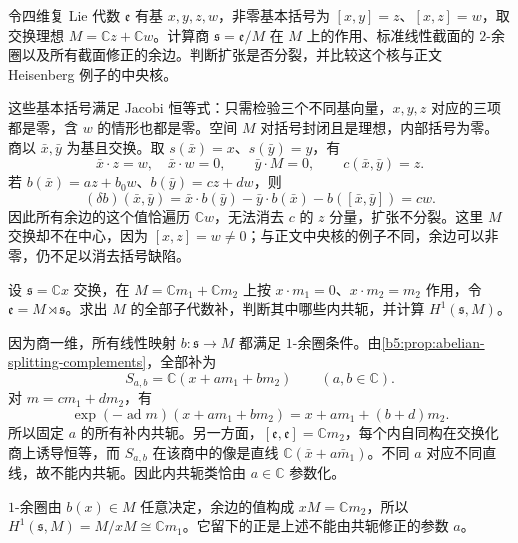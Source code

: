 \begin{optionalexercise}\label{b5:ex:12-abelian-extension-heisenberg}
	令四维复 Lie 代数 \(\mathfrak e\) 有基 \(x,y,z,w\)，非零基本括号为 \([x,y]=z\)、\([x,z]=w\)，取交换理想 \(M=\mathbb Cz+\mathbb Cw\)。计算商 \(\mathfrak s=\mathfrak e/M\) 在 \(M\) 上的作用、标准线性截面的 \(2\)-余圈以及所有截面修正的余边。判断扩张是否分裂，并比较这个核与正文 Heisenberg 例子的中央核。
\end{optionalexercise}
\begin{solution}
	这些基本括号满足 Jacobi 恒等式：只需检验三个不同基向量，\(x,y,z\) 对应的三项都是零，含 \(w\) 的情形也都是零。空间 \(M\) 对括号封闭且是理想，内部括号为零。商以 \(\bar x,\bar y\) 为基且交换。取 \(s(\bar x)=x\)、\(s(\bar y)=y\)，有
	\[
		\bar x\cdot z=w,\quad \bar x\cdot w=0, \qquad \bar y\cdot M=0, \qquad c(\bar x,\bar y)=z.
	\]
	若 \(b(\bar x)=az+b_0w\)、\(b(\bar y)=cz+dw\)，则
	\[
		(\delta b)(\bar x,\bar y) =\bar x\cdot b(\bar y)-\bar y\cdot b(\bar x)-b([\bar x,\bar y])=cw.
	\]
	因此所有余边的这个值恰遍历 \(\mathbb Cw\)，无法消去 \(c\) 的 \(z\) 分量，扩张不分裂。这里 \(M\) 交换却不在中心，因为 \([x,z]=w\ne0\)；与正文中央核的例子不同，余边可以非零，仍不足以消去括号缺陷。
\end{solution}

\begin{optionalexercise}\label{b5:ex:12-complement-graphs}
	设 \(\mathfrak s=\mathbb Cx\) 交换，在 \(M=\mathbb Cm_1+\mathbb Cm_2\) 上按 \(x\cdot m_1=0\)、\(x\cdot m_2=m_2\) 作用，令 \(\mathfrak e=M\rtimes\mathfrak s\)。求出 \(M\) 的全部子代数补，判断其中哪些内共轭，并计算 \(H^1(\mathfrak s,M)\)。
\end{optionalexercise}
\begin{solution}
	因为商一维，所有线性映射 \(b:\mathfrak s\rightarrow M\) 都满足 \(1\)-余圈条件。由\cref{b5:prop:abelian-splitting-complements}，全部补为
	\[
		S_{a,b}=\mathbb C(x+am_1+bm_2)\qquad(a,b\in\mathbb C).
	\]
	对 \(m=cm_1+dm_2\)，有
	\[
		\exp(-\operatorname{ad}m)(x+am_1+bm_2) =x+am_1+(b+d)m_2.
	\]
	所以固定 \(a\) 的所有补内共轭。另一方面，\([\mathfrak e,\mathfrak e]=\mathbb Cm_2\)，每个内自同构在交换化商上诱导恒等，而 \(S_{a,b}\) 在该商中的像是直线 \(\mathbb C(\bar x+a\bar m_1)\)。不同 \(a\) 对应不同直线，故不能内共轭。因此内共轭类恰由 \(a\in\mathbb C\) 参数化。

	\(1\)-余圈由 \(b(x)\in M\) 任意决定，余边的值构成 \(xM=\mathbb Cm_2\)，所以 \(H^1(\mathfrak s,M)=M/xM\cong\mathbb Cm_1\)。它留下的正是上述不能由共轭修正的参数 \(a\)。
\end{solution}

